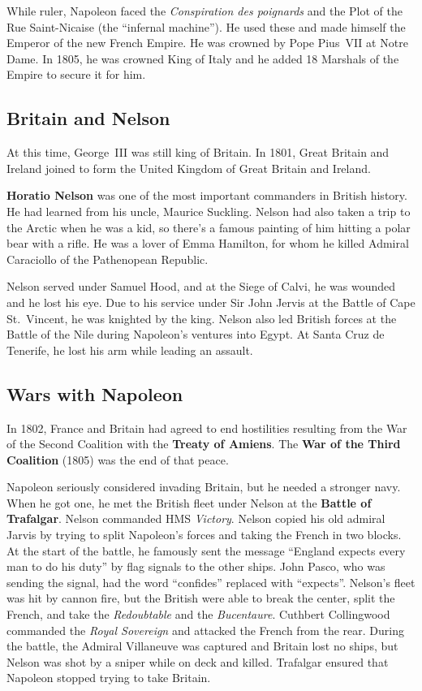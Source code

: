 While ruler, Napoleon faced the \textit{Conspiration des poignards}
and the Plot of the Rue Saint-Nicaise (the ``infernal machine'').
He used these and made himself the Emperor of the new French Empire.
He was crowned by Pope Pius~VII at Notre Dame.
In 1805, he was crowned King of Italy and he added 18 Marshals of the Empire to secure it for him.

\subsection*{Britain and Nelson}

At this time, George~III was still king of Britain.
In 1801, Great Britain and Ireland joined to form the United Kingdom of Great Britain and Ireland.

\textbf{Horatio Nelson} was one of the most important commanders in British history.
He had learned from his uncle, Maurice Suckling.
Nelson had also taken a trip to the Arctic when he was a kid,
so there's a famous painting of him hitting a polar bear with a rifle.
He was a lover of Emma Hamilton, for whom he killed Admiral Caraciollo of the Pathenopean Republic.

Nelson served under Samuel Hood, and at the Siege of Calvi, he was wounded and he lost his eye.
Due to his service under Sir John Jervis at the Battle of Cape St.\ Vincent, he was knighted by the king.
Nelson also led British forces at the Battle of the Nile during Napoleon's ventures into Egypt.
At Santa Cruz de Tenerife, he lost his arm while leading an assault.

\subsection*{Wars with Napoleon}

In 1802, France and Britain had agreed to end hostilities resulting from the War of the Second Coalition
with the \textbf{Treaty of Amiens}.
The \textbf{War of the Third Coalition} (1805) was the end of that peace.

Napoleon seriously considered invading Britain, but he needed a stronger navy.
When he got one, he met the British fleet under Nelson at the \textbf{Battle of Trafalgar}.
Nelson commanded HMS \textit{Victory}.
Nelson copied his old admiral Jarvis by trying to split Napoleon's forces and taking the French in two blocks.
At the start of the battle, he famously sent the message
``England expects every man to do his duty'' by flag signals to the other ships.
John Pasco, who was sending the signal, had the word ``confides'' replaced with ``expects''.
Nelson's fleet was hit by cannon fire, but the British were able to break the center, split the French,
and take the \textit{Redoubtable} and the \textit{Bucentaure}.
Cuthbert Collingwood commanded the \textit{Royal Sovereign} and attacked the French from the rear.
During the battle, the Admiral Villaneuve was captured and Britain lost no ships,
but Nelson was shot by a sniper while on deck and killed.
Trafalgar ensured that Napoleon stopped trying to take Britain.

